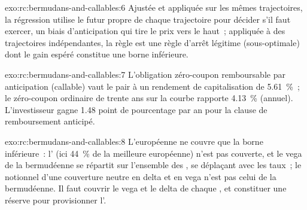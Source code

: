 \begin{solution}{exo:rc:bermudans-and-callables:6}
Ajustée et appliquée sur les mêmes trajectoires, la régression utilise le futur propre de chaque trajectoire pour
décider s'il faut exercer, un biais d'anticipation qui tire le prix vers le haut~; appliquée à des trajectoires
indépendantes, la règle est une règle d'arrêt légitime (sous-optimale) dont le gain espéré constitue une borne
inférieure.
\end{solution}

\begin{solution}{exo:rc:bermudans-and-callables:7}
L'obligation zéro-coupon remboursable par anticipation (callable) vaut le pair à un rendement de capitalisation de 5.61~\%~; le
zéro-coupon ordinaire de trente ans sur la courbe rapporte 4.13~\% (annuel). L'investisseur gagne 1.48
point de pourcentage par an pour la clause de remboursement anticipé.
\end{solution}

\begin{solution}{exo:rc:bermudans-and-callables:8}
L'européenne ne couvre que la borne inférieure~: l' (ici 44~\% de la
meilleure européenne) n'est pas couverte, et le vega de la bermudéenne se répartit sur l'ensemble des ,
se déplaçant avec les taux~; le notionnel d'une couverture neutre en delta et en vega n'est pas celui de la bermudéenne.
Il faut couvrir le vega et le delta de chaque , et
constituer une réserve pour provisionner l'.
\end{solution}

